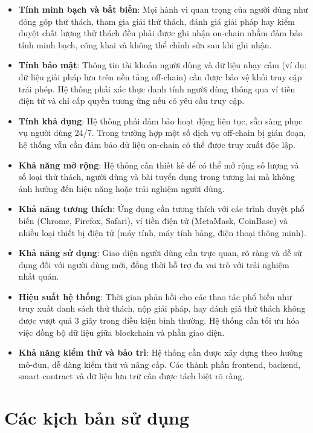 \begin{itemize}
  \item \textbf{Tính minh bạch và bất biến}: Mọi hành vi quan trọng của người dùng như đóng góp thử thách, tham gia giải thử thách, đánh giá giải pháp hay kiểm duyệt chất lượng thử thách đều phải được ghi nhận on-chain nhằm đảm bảo tính minh bạch, công khai và không thể chỉnh sửa sau khi ghi nhận.
  \item \textbf{Tính bảo mật}: Thông tin tài khoản người dùng và dữ liệu nhạy cảm (ví dụ: dữ liệu giải pháp lưu trên nền tảng off-chain) cần được bảo vệ khỏi truy cập trái phép. Hệ thống phải xác thực danh tính người dùng thông qua ví tiền điện tử và chỉ cấp quyền tương ứng nếu có yêu cầu truy cập.
  \item \textbf{Tính khả dụng}: Hệ thống phải đảm bảo hoạt động liên tục, sẵn sàng phục vụ người dùng 24/7. Trong trường hợp một số dịch vụ off-chain bị gián đoạn, hệ thống vẫn cần đảm bảo dữ liệu on-chain có thể được truy xuất độc lập.
  \item \textbf{Khả năng mở rộng}: Hệ thống cần thiết kế để có thể mở rộng số lượng và số loại thử thách, người dùng và bài tuyển dụng trong tương lai mà không ảnh hưởng đến hiệu năng hoặc trải nghiệm người dùng.
  \item \textbf{Khả năng tương thích}: Ứng dụng cần tương thích với các trình duyệt phổ biến (Chrome, Firefox, Safari), ví tiền điện tử (MetaMask, CoinBase) và nhiều loại thiết bị điện tử (máy tính, máy tính bảng, điện thoại thông minh).
  \item \textbf{Khả năng sử dụng}: Giao diện người dùng cần trực quan, rõ ràng và dễ sử dụng đối với người dùng mới, đồng thời hỗ trợ đa vai trò với trải nghiệm nhất quán.
  \item \textbf{Hiệu suất hệ thống}: Thời gian phản hồi cho các thao tác phổ biến như truy xuất danh sách thử thách, nộp giải pháp, hay đánh giá thử thách không được vượt quá 3 giây trong điều kiện bình thường. Hệ thống cần tối ưu hóa việc đồng bộ dữ liệu giữa blockchain và phần giao diện.
  \item \textbf{Khả năng kiểm thử và bảo trì}: Hệ thống cần được xây dựng theo hướng mô-đun, dễ dàng kiểm thử và nâng cấp. Các thành phần frontend, backend, smart contract và dữ liệu lưu trữ cần được tách biệt rõ ràng.
\end{itemize}

\section{Các kịch bản sử dụng}

